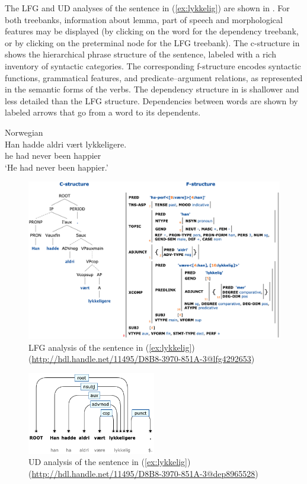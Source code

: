 \documentclass[output=paper,hidelinks]{langscibook}
\begin{document}
The LFG and UD analyses of the sentence in (\ref{ex:lykkelig}) are shown in .
For both treebanks, information about lemma, part of speech and morphological features may be displayed (by clicking on the word for the dependency treebank, or by clicking on the preterminal node for the LFG treebank).
The c-structure in  shows the hierarchical phrase structure of the sentence, labeled with a rich inventory of syntactic categories.
The corresponding f-structure encodes syntactic functions, grammatical features, and predicate--argument relations, as represented in the semantic forms of the verbs.
The dependency structure in  is shallower and less detailed than the LFG structure. %
Dependencies between words are shown by labeled arrows that go from a word to its dependents.


\ea Norwegian\\
\gll Han hadde aldri vært lykkeligere.\\  
     he had never been happier\\ 
\glt `He had never been happier.'
\label{ex:lykkelig}
\z

\begin{figure}
    \includegraphics[width=\textwidth]{figures/Treebanks/happy-LFG.png}
    \caption{LFG analysis of the sentence in (\ref{ex:lykkelig}) (\url{http://hdl.handle.net/11495/D8B8-3970-851A-3@lfg4292653}) }
    \label{fig:happy-LFG}
\end{figure}

\begin{figure}
    \includegraphics[width=0.5\textwidth]{figures/Treebanks/happy-UD.png}
    \caption{UD analysis of the sentence in (\ref{ex:lykkelig}) (\url{http://hdl.handle.net/11495/D8B8-3970-851A-3@dep8965528}) }
    \label{fig:happy-UD-morph}
\end{figure}
\end{document}
